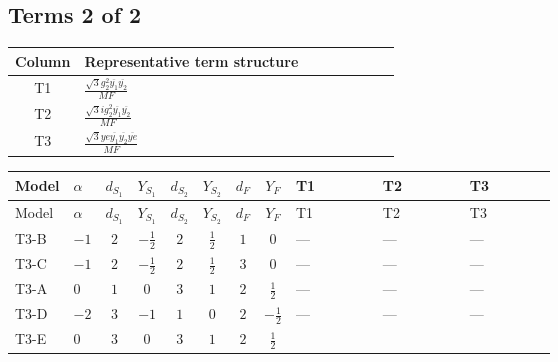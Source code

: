 \documentclass[8pt]{article}
\begin{document}
\begin{landscape}
\subsection*{Terms 2 of 2}
\begin{center}
\begin{tabular}{@{}c >{\raggedright\arraybackslash}p{0.82\linewidth}@{}}
\toprule
Column & Representative term structure \\
\midrule
T1 & \(\displaystyle \frac{\sqrt{3} g_{2}^{2} \overline{y_{1}} \overline{y_{2}}}{MF}\) \\
\midrule
T2 & \(\displaystyle \frac{\sqrt{3} i g_{2}^{2} \overline{y_{1}} \overline{y_{2}}}{MF}\) \\
\midrule
T3 & \(\displaystyle \frac{\sqrt{3} ye \overline{y_{1}} \overline{y_{2}} \overline{ye}}{MF}\) \\
\midrule
\bottomrule
\end{tabular}
\end{center}
\smallskip
\tiny
\begin{longtable}{@{}llcccccc >{\raggedright\arraybackslash}p{0.21\linewidth} >{\raggedright\arraybackslash}p{0.21\linewidth} >{\raggedright\arraybackslash}p{0.21\linewidth}@{}}
\toprule
Model & $\alpha$ & $d_{S_1}$ & $Y_{S_1}$ & $d_{S_2}$ & $Y_{S_2}$ & $d_F$ & $Y_F$ & T1 & T2 & T3 \\
\midrule
\endfirsthead
\toprule
Model & $\alpha$ & $d_{S_1}$ & $Y_{S_1}$ & $d_{S_2}$ & $Y_{S_2}$ & $d_F$ & $Y_F$ & T1 & T2 & T3 \\
\midrule
\endhead
T3-B & $-1$ & $2$ & $-\frac{1}{2}$ & $2$ & $\frac{1}{2}$ & $1$ & $0$ & --- & --- & --- \\
\midrule
T3-C & $-1$ & $2$ & $-\frac{1}{2}$ & $2$ & $\frac{1}{2}$ & $3$ & $0$ & --- & --- & --- \\
\midrule
T3-A & $0$ & $1$ & $0$ & $3$ & $1$ & $2$ & $\frac{1}{2}$ & --- & --- & --- \\
\midrule
T3-D & $-2$ & $3$ & $-1$ & $1$ & $0$ & $2$ & $-\frac{1}{2}$ & --- & --- & --- \\
\midrule
T3-E & $0$ & $3$ & $0$ & $3$ & $1$ & $2$ & $\frac{1}{2}$ & \scriptsize\adjustbox{max width=\linewidth}{$\begin{gathered} \frac{11 \sqrt{3} g_{2}^{2} \overline{y_{1}} \overline{y_{2}}}{8 MF}\end{gathered}$} & \scriptsize\adjustbox{max width=\linewidth}{$\begin{gathered} - \frac{\sqrt{3} i g_{2}^{2} \overline{y_{1}} \overline{y_{2}}}{6 MF}\end{gathered}$} & \scriptsize\adjustbox{max width=\linewidth}{$\begin{gathered} - \frac{\sqrt{3} ye \overline{y_{1}} \overline{y_{2}} \overline{ye}}{12 MF}\end{gathered}$} \\
\midrule
\bottomrule
\end{longtable}
\clearpage

\end{landscape}
\end{document}
